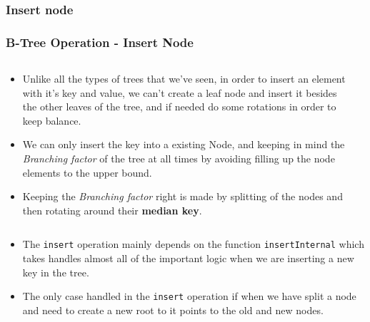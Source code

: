 \documentclass{beamer}
\begin{document}
\begin{frame}[t,allowframebreaks]
    \subsubsection{Insert node}
    \frametitle{B-Tree Operation - Insert Node}
    \begin{columns}
        \begin{column}{\textlecolumn}
            \begin{block}{}
                \begin{itemize}
                    \item Unlike all the types of trees that we've seen, in order to insert an element with it's key and value, we can't create a leaf node and insert it besides the other leaves of the tree, and if needed do some rotations in order to keep balance.
                    \item We can only insert the key into a existing Node, and keeping in mind the \emph{Branching factor} of the tree at all times by avoiding filling up the node elements to the upper bound.
                    \item Keeping the \emph{Branching factor} right is made by splitting of the nodes and then rotating around their \textbf{median key}.
                \end{itemize}
            \end{block}
        \end{column}
        \begin{column}{\textricolumn}
        \end{column}
    \end{columns}
    \begin{columns}
        \begin{column}{\textlecolumn}
            \begin{block}{}
                \begin{itemize}
                    \item The \lstinline|insert| operation mainly depends on the function \lstinline|insertInternal| which takes handles almost all of the important logic when we are inserting a new key in the tree.
                    \item The only case handled in the \lstinline|insert| operation if when we have split a node and need to create a new root to it points to the old and new nodes.
                \end{itemize}
            \end{block}

\end{column}
\end{columns}
\end{frame}
\end{document}
